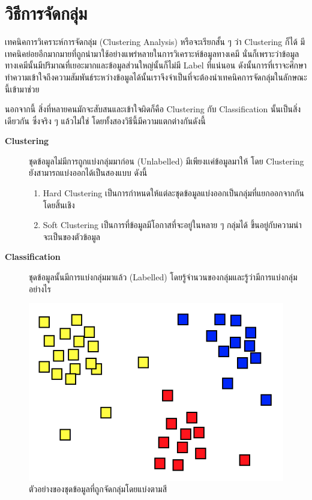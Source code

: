 \section{วิธีการจัดกลุ่ม}
\label{sec:clustering}

เทคนิคการวิเคราะห์การจัดกลุ่ม (Clustering Analysis) หรือจะเรียกสั้น ๆ ว่า Clustering ก็ได้ มีเทคนิคย่อยอีกมากมายที่ถูกนำมาใช้อย่างแพร่หลายในการวิเคราะห์ข้อมูลทางเคมี นั่นก็เพราะว่าข้อมูลทางเคมีนั้นมีปริมาณที่เยอะมากและข้อมูลส่วนใหญ่นั้นก็ไม่มี Label ที่แน่นอน ดังนั้นการที่เราจะศึกษาทำความเข้าใจถึงความสัมพันธ์ระหว่างข้อมูลได้นั้นเราจึงจำเป็นที่จะต้องนำเทคนิคการจัดกลุ่มในลักษณะนี้เข้ามาช่วย

นอกจากนี้ สิ่งที่หลายคนมักจะสับสนและเข้าใจผิดก็คือ Clustering กับ Classification นั้นเป็นสิ่งเดียวกัน ซึ่งจริง ๆ แล้วไม่ใช่ โดยทั้งสองวิธีนี้มีความแตกต่างกันดังนี้
%
\begin{description}
    \item[\textbf{Clustering}] ชุดข้อมูลไม่มีการถูกแบ่งกลุ่มมาก่อน (Unlabelled) มีเพียงเเค่ข้อมูลมาให้ โดย Clustering ยังสามารถแบ่งออกได้เป็นสองแบบ ดังนี้
        \begin{enumerate}[topsep=0pt,noitemsep]\setlength\itemsep{0.5em}
            \item Hard Clustering เป็นการกำหนดให้แต่ละชุดข้อมูลแบ่งออกเป็นกลุ่มที่แยกออกจากกันโดยสิ้นเชิง

            \item Soft Clustering เป็นการที่ข้อมูลมีโอกาสที่จะอยู่ในหลาย ๆ กลุ่มได้ ขึ้นอยู่กับความน่าจะเป็นของตัวข้อมูล
        \end{enumerate}
    \item[\textbf{Classification}] ชุดข้อมูลนั้นมีการแบ่งกลุ่มมาแล้ว (Labelled) โดยรู้จำนวนของกลุ่มและรู้ว่ามีการแบ่งกลุ่มอย่างไร
\end{description}

\begin{figure}[H]
    \centering
    \includegraphics[width=0.35\linewidth]{fig/cluster.png}
    \caption{ตัวอย่างของชุดข้อมูลที่ถูกจัดกลุ่มโดยแบ่งตามสี}
    \label{fig:cluster}
\end{figure}

